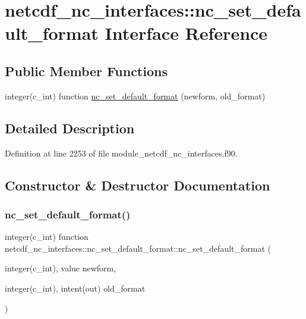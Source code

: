 \hypertarget{interfacenetcdf__nc__interfaces_1_1nc__set__default__format}{}\section{netcdf\+\_\+nc\+\_\+interfaces\+:\+:nc\+\_\+set\+\_\+default\+\_\+format Interface Reference}
\label{interfacenetcdf__nc__interfaces_1_1nc__set__default__format}
\subsection*{Public Member Functions}
\begin{DoxyCompactItemize}
\item 
integer(c\+\_\+int) function \hyperlink{interfacenetcdf__nc__interfaces_1_1nc__set__default__format_a42c462f389f669221c2665dbf892483c}{nc\+\_\+set\+\_\+default\+\_\+format} (newform, old\+\_\+format)
\end{DoxyCompactItemize}


\subsection{Detailed Description}


Definition at line 2253 of file module\+\_\+netcdf\+\_\+nc\+\_\+interfaces.\+f90.



\subsection{Constructor \& Destructor Documentation}
\mbox{\label{interfacenetcdf__nc__interfaces_1_1nc__set__default__format_a42c462f389f669221c2665dbf892483c}} 
\subsubsection{\texorpdfstring{nc\+\_\+set\+\_\+default\+\_\+format()}{nc\_set\_default\_format()}}
{\footnotesize\ttfamily integer(c\+\_\+int) function netcdf\+\_\+nc\+\_\+interfaces\+::nc\+\_\+set\+\_\+default\+\_\+format\+::nc\+\_\+set\+\_\+default\+\_\+format (\begin{DoxyParamCaption}\item[{integer(c\+\_\+int), value}]{newform,  }\item[{integer(c\+\_\+int), intent(out)}]{old\+\_\+format }\end{DoxyParamCaption})}



